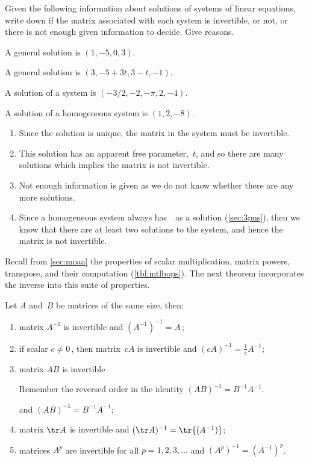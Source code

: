 \begin{example} \label{eg:}
Given the following information about solutions of systems of linear equations, write down if the matrix associated with each system is invertible, or not, or there is not enough given information to decide.  Give reasons.
\begin{parts}
\item A general solution is \((1,-5,0,3)\).
\item A general solution is \((3,-5+3t,3-t,-1)\).
\item A solution of a system is \((-3/2,-2,-\pi,2,-4)\).
\item A solution of a homogeneous system is \((1,2,-8)\).
\end{parts}
\begin{solution} 
\begin{enumerate}
\item Since the solution is unique, the matrix in the system must be invertible.
\item This solution has an apparent free parameter,~\(t\), and so there are many solutions which implies the matrix is not invertible.
\item Not enough information is given as we do not know whether there are any more solutions.
\item Since a homogeneous system always has~\ov\ as a solution (\autoref{sec:3pns}), then we know that there are at least two solutions to the system, and hence the matrix is not invertible.
\end{enumerate}
\end{solution}
\end{example}




Recall from \autoref{sec:moaa} the properties of scalar multiplication, matrix powers, transpose, and their computation (\autoref{tbl:mtlbops}).
The next theorem incorporates the inverse into this suite of properties.


\begin{theorem} \label{thm:invprop} 
Let \(A\) and~\(B\) be  matrices of the same size, then:
\begin{enumerate}
\item\label{thm:invpropa}  matrix \(A^{-1}\) is invertible and \((A^{-1})^{-1}=A\)\,;
\item\label{thm:invpropb} if scalar \(c\neq0\)\,, then matrix~\(cA\) is invertible and \((cA)^{-1}=\frac1cA^{-1}\);
\item\label{thm:invpropc} 
matrix \(AB\) is invertible\begin{aside}
Remember the reversed order in the identity $(AB)^{-1}=B^{-1}A^{-1}$.
\end{aside} 
and \((AB)^{-1}=B^{-1}A^{-1}\);
\item\label{thm:invpropd} matrix \(\tr A\) is invertible and \((\tr A)^{-1}=\tr{(A^{-1})}\);
\item\label{thm:invprope} matrices \(A^p\) are invertible for all \(p=1,2,3,\ldots\) and \((A^p)^{-1}=(A^{-1})^p\).
\end{enumerate}
\end{theorem}


